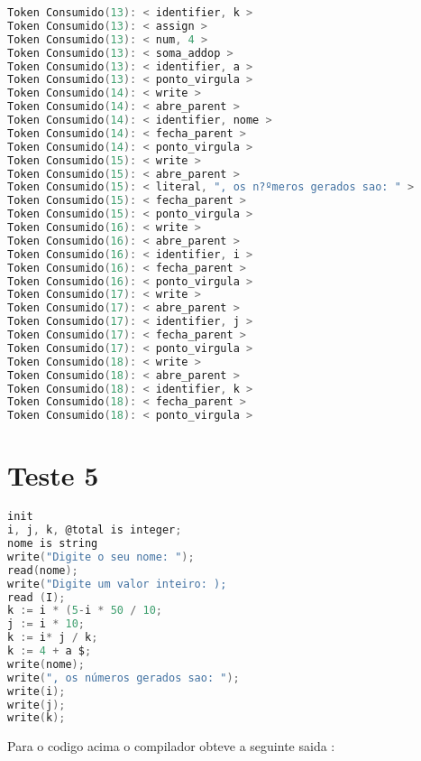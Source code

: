 \begin{lstlisting}[caption={Saida Correta para o Codigo de teste  : Teste4.txt},label={Entrada 1},language=C]
Token Consumido(13): < identifier, k >
Token Consumido(13): < assign >
Token Consumido(13): < num, 4 >
Token Consumido(13): < soma_addop >
Token Consumido(13): < identifier, a >
Token Consumido(13): < ponto_virgula >
Token Consumido(14): < write >
Token Consumido(14): < abre_parent >
Token Consumido(14): < identifier, nome >
Token Consumido(14): < fecha_parent >
Token Consumido(14): < ponto_virgula >
Token Consumido(15): < write >
Token Consumido(15): < abre_parent >
Token Consumido(15): < literal, ", os n?ºmeros gerados sao: " >
Token Consumido(15): < fecha_parent >
Token Consumido(15): < ponto_virgula >
Token Consumido(16): < write >
Token Consumido(16): < abre_parent >
Token Consumido(16): < identifier, i >
Token Consumido(16): < fecha_parent >
Token Consumido(16): < ponto_virgula >
Token Consumido(17): < write >
Token Consumido(17): < abre_parent >
Token Consumido(17): < identifier, j >
Token Consumido(17): < fecha_parent >
Token Consumido(17): < ponto_virgula >
Token Consumido(18): < write >
Token Consumido(18): < abre_parent >
Token Consumido(18): < identifier, k >
Token Consumido(18): < fecha_parent >
Token Consumido(18): < ponto_virgula >


\end{lstlisting}\newline




\section{Teste 5}



\begin{lstlisting}[caption={Teste5.txt},label={lst:label},language=C]
init
i, j, k, @total is integer;
nome is string
write("Digite o seu nome: ");
read(nome);
write("Digite um valor inteiro: );
read (I);
k := i * (5-i * 50 / 10;
j := i * 10;
k := i* j / k;
k := 4 + a $;
write(nome);
write(", os números gerados sao: ");
write(i);
write(j);
write(k);

\end{lstlisting}

Para o codigo acima o compilador obteve a seguinte saida :

